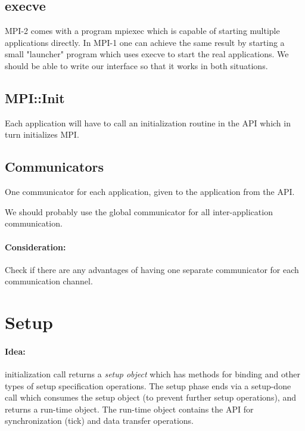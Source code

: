 \documentclass[a4paper]{report}
\newenvironment{metatext}%
{\color{blue}}%
{}
\begin{document}
\subsection{execve}

\begin{metatext}
  MPI-2 comes with a program mpiexec which is capable of starting
  multiple applications directly.  In MPI-1 one can achieve the same
  result by starting a small "launcher" program which uses execve to
  start the real applications.  We should be able to write our interface
  so that it works in both situations.
\end{metatext}

\subsection{MPI::Init}

Each application will have to call an initialization routine in the API
which in turn initializes MPI.


\subsection{Communicators}

One communicator for each application, given to the application from
the API.

We should probably use the global communicator for all
inter-application communication.

\begin{metatext}
  \paragraph{Consideration:} Check if there are any advantages of having one
  separate communicator for each communication channel.
\end{metatext}


\section{Setup}

\paragraph{Idea:} initialization call returns a \emph{setup object}
which has methods for binding and other types of setup specification
operations.  The setup phase ends via a setup-done call which consumes
the setup object (to prevent further setup operations), and returns a
run-time object.  The run-time object contains the API for
synchronization (tick) and data transfer operations.
\end{document}
